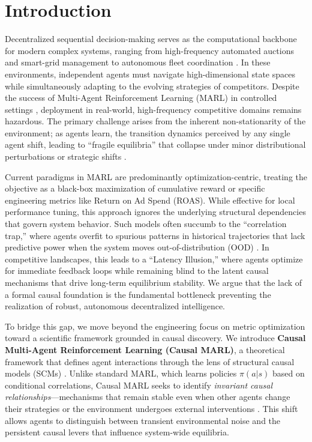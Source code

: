 \section{Introduction}

Decentralized sequential decision-making serves as the computational backbone for modern complex systems, ranging from high-frequency automated auctions and smart-grid management to autonomous fleet coordination \cite{shoham2008multiagent, sutton2018reinforcement}. In these environments, independent agents must navigate high-dimensional state spaces while simultaneously adapting to the evolving strategies of competitors. Despite the success of Multi-Agent Reinforcement Learning (MARL) in controlled settings \cite{lowe2017multi}, deployment in real-world, high-frequency competitive domains remains hazardous. The primary challenge arises from the inherent non-stationarity of the environment; as agents learn, the transition dynamics perceived by any single agent shift, leading to ``fragile equilibria'' that collapse under minor distributional perturbations or strategic shifts \cite{hernandez2019survey, papoudakis2021agent}.

Current paradigms in MARL are predominantly optimization-centric, treating the objective as a black-box maximization of cumulative reward or specific engineering metrics like Return on Ad Spend (ROAS). While effective for local performance tuning, this approach ignores the underlying structural dependencies that govern system behavior. Such models often succumb to the ``correlation trap,'' where agents overfit to spurious patterns in historical trajectories that lack predictive power when the system moves out-of-distribution (OOD) \cite{pitis2022counterfactual, arjovsky2019invariant}. In competitive landscapes, this leads to a ``Latency Illusion,'' where agents optimize for immediate feedback loops while remaining blind to the latent causal mechanisms that drive long-term equilibrium stability. We argue that the lack of a formal causal foundation is the fundamental bottleneck preventing the realization of robust, autonomous decentralized intelligence.

To bridge this gap, we move beyond the engineering focus on metric optimization toward a scientific framework grounded in causal discovery. We introduce \textbf{Causal Multi-Agent Reinforcement Learning (Causal MARL)}, a theoretical framework that defines agent interactions through the lens of structural causal models (SCMs) \cite{pearl2009causality}. Unlike standard MARL, which learns policies $\pi(a|s)$ based on conditional correlations, Causal MARL seeks to identify \textit{invariant causal relationships}—mechanisms that remain stable even when other agents change their strategies or the environment undergoes external interventions \cite{peters2016causal, scholkopf2021causality}. This shift allows agents to distinguish between transient environmental noise and the persistent causal levers that influence system-wide equilibria.

